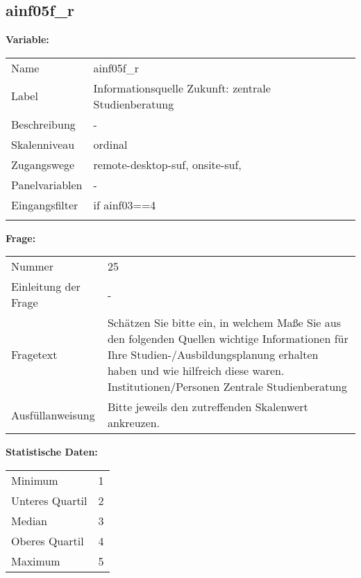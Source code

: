 	
	
	\subsection{ainf05f\_r}
	\label{subSection:ainf05f_r}

	\noindent\textbf{Variable:}\\
		\begin{tabular}{lL{11.3cm}}
			\label{tableVariable:ainf05f_r}
			Name & ainf05f\_r \\
			Label & Informationsquelle Zukunft: zentrale Studienberatung \\
			Beschreibung & - \\
			Skalenniveau & ordinal \\
			Zugangswege &
				remote-desktop-suf,
				onsite-suf,
 \\
			Panelvariablen & -
			 \\
			Eingangsfilter & if ainf03==4 \\
 \\
		\end{tabular}

		\vspace*{1 cm}
		\noindent\textbf{Frage:}\\
		\begin{tabular}{lL{11.3cm}}
			\label{tableQuestion:ainf05f_r}
			Nummer & 25 \\
			Einleitung der Frage & - \\
			Fragetext & Schätzen Sie bitte ein, in welchem Maße Sie aus den folgenden Quellen wichtige Informationen für Ihre Studien-/Ausbildungsplanung erhalten haben und wie hilfreich diese waren.
Institutionen/Personen
Zentrale Studienberatung \\
			Ausfüllanweisung & Bitte jeweils den zutreffenden Skalenwert ankreuzen. \\
		\end{tabular}


		\vspace*{1 cm}
		\noindent\textbf{Statistische Daten:}\\
			\begin{tabular}{ll}
				\label{tableStatistics:ainf05f_r}
					Minimum & 1 \\
					Unteres Quartil & 2 \\
					Median & 3 \\
					Oberes Quartil & 4 \\
					Maximum & 5 \\
			\end{tabular}



